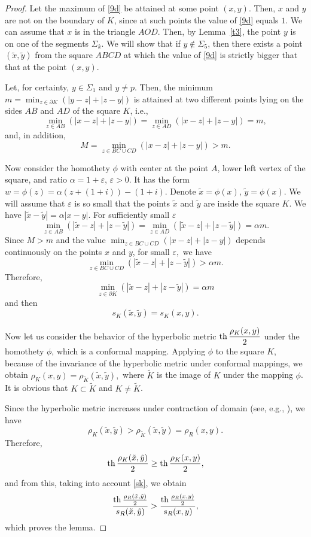 \documentclass[12pt,a4paper]{amsart}
\def\th{\mathop{\rm th}\nolimits}
\begin{document}
    \begin{proof}
Let the maximum of \eqref{9d} be attained at some point $(x,y)$.
Then, $x$ and $y$ are not on the boundary of $K$, since at such
points the value of \eqref{9d} equals $1$.   We can assume that $x$
is in the triangle $AOD$. Then, by Lemma~\ref{t3}, the point  $y$ is
on one of the segments $\Sigma_k$. We will show that if $y\not\in
\Sigma_5$, then there exists a point $(\tilde{x},\tilde{y})$ from
the square $ABCD$ at which the value of \eqref{9d} is strictly
bigger that that at the point $(x,y)$.

Let, for certainty, $y \in \Sigma_1$ and $y\neq p$.
Then, the minimum $m=\min_{z\in \partial K}(|y-z|+|z-y|)$ is attained
at two different points lying on the sides $AB$ and $AD$ of the
square $K$, i.e.,
$$
\min_{z\in AB}(|x-z|+|z-y|)=\min_{z\in  AD}(|x-z|+|z-y|)=m,
$$
and, in addition,  $$ M=\min_{z\in BC\cup CD}(|x-z|+|z-y|)>m.$$

Now consider the homothety $\phi$ with center at the point $A$,
lower left vertex of the square, and ratio $\alpha=1+\varepsilon$,
$\varepsilon>0$. It has the form $w=\phi(z)=\alpha (z+(1+i))-(1+i)$.
Denote $\tilde{x}=\phi(x)$, $\tilde{y}=\phi(x)$. We will assume that
$\varepsilon$ is so small that the points $\tilde{x}$ and
$\tilde{y}$ are inside  the square $K$. We have
$|\tilde{x}-\tilde{y}|=\alpha|x-y|$. For sufficiently small
$\varepsilon$
$$
\min_{z\in AB}(|\tilde{x}-z|+|z-\tilde{y}|)=\min_{z\in AD}(|\tilde{x}-z|+|z-\tilde{y}|)=\alpha m.
$$
Since $M>m$ and the value $\min_{z\in BC\cup
CD}(|x-z|+|z-y|)$ depends continuously on the points $x$ and $y$, for small $\varepsilon,$ we have
$$
\min_{z\in BC\cup CD}(|\tilde{x}-z|+|z-\tilde{y}|)>\alpha m.
$$
Therefore,
$$
\min_{z\in \partial K}(|\tilde{x}-z|+|z-\tilde{y}|)=\alpha m
$$
and then
\begin{equation}\label{sk}
 s_K(\tilde{x},\tilde{y})= s_K(x,y).
\end{equation}

Now let us consider the behavior of the hyperbolic metric
$\displaystyle\th \frac{\rho_K(x,y)}{2}$ under the homothety $\phi$,
which is a conformal mapping. Applying $\phi$ to the square $K$,
because of the invariance of the hyperbolic metric under conformal
mappings,  we obtain  $\rho_K(x,y) =
\rho_{\tilde{K}}(\tilde{x},\tilde{y}),$ where $\tilde{K}$ is the
image of $K$ under the mapping $\phi$. It is obvious that $K \subset
\tilde{K}$ and   $K \neq\tilde{K}$.

Since the hyperbolic metric increases under contraction of domain
(see, e.g., \cite[ch.~VIII]{goluzin}),
we have
$$
\rho_K(\tilde{x},\tilde{y}) >  \rho_{\tilde K}(\tilde{x},\tilde{y}) =  \rho_R(x, y).
$$
Therefore,
$$
\displaystyle\th \frac{\rho_K(\tilde{x},\tilde{y})}{2} \geq  \th
\frac{\rho_K(x, y)}{2},
$$
and from this, taking into account \eqref{sk}, we obtain
$$\displaystyle\frac{\th \frac{\rho_R(\tilde{x},\tilde{y})}{2}}{s_R(\tilde{x},\tilde{y})}>\displaystyle\frac{\th \frac{\rho_R(x,y)}{2}}{s_R(x,y)},
$$
which proves the lemma.
\end{proof}
\end{document}
